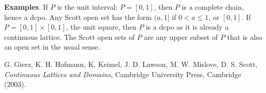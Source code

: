 \documentclass[12pt]{article}
\begin{document}
\textbf{Examples}.  If $P$ is the unit interval: $P=[0,1]$, then $P$ is a complete chain, hence a dcpo.  Any Scott open set has the form $(a,1]$ if $0<a\le 1$, or $[0,1]$.  If $P=[0,1]\times [0,1]$, the unit square, then $P$ is a dcpo as it is already a continuous lattice.  The Scott open sets of $P$ are any upper subset of $P$ that is also an open set in the usual sense.

\begin{thebibliography}{8}
 G. Gierz, K. H. Hofmann, K. Keimel, J. D. Lawson, M. W. Mislove, D. S. Scott, {\em Continuous Lattices and Domains}, Cambridge University Press, Cambridge (2003).
\end{thebibliography}
\end{document}
